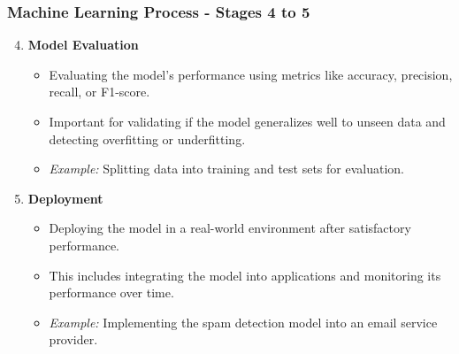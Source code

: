 \documentclass[aspectratio=169]{beamer}
\begin{document}
\begin{frame}[fragile]
  \frametitle{Machine Learning Process - Stages 4 to 5}
  \begin{enumerate}
    \setcounter{enumi}{3} %
    \item \textbf{Model Evaluation}
      \begin{itemize}
        \item Evaluating the model's performance using metrics like accuracy, precision, recall, or F1-score.
        \item Important for validating if the model generalizes well to unseen data and detecting overfitting or underfitting.
        \item \textit{Example:} Splitting data into training and test sets for evaluation.
      \end{itemize}
      
    \item \textbf{Deployment}
      \begin{itemize}
        \item Deploying the model in a real-world environment after satisfactory performance.
        \item This includes integrating the model into applications and monitoring its performance over time.
        \item \textit{Example:} Implementing the spam detection model into an email service provider.
      \end{itemize}
  \end{enumerate}
\end{frame}
\end{document}
